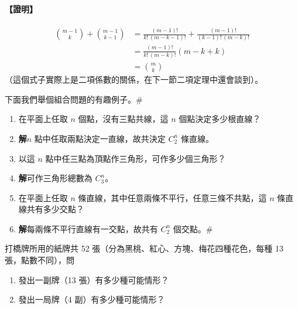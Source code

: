\paragraph{【證明】}
\begin{align*}
\binom{m-1}{k} + \binom{m-1}{k-1} &= \frac{(m-1)!}{k!\, (m-k-1)!} + \frac{(m-1)!}{(k-1)!\, (m-k)!} \\
&= \frac{(m-1)!}{k!\, (m-k)!} (m - k + k) \\
&= \binom{m}{k}
\end{align*}
（這個式子實際上是二項係數的關係，在下一節二項定理中還會談到）。

下面我們舉個組合問題的有趣例子。\hfill $\#$

\medskip
\begin{example}\label{ex:b5-2-14}
\begin{enumerate}[label=(\roman*), topsep=2pt, itemsep=4pt]
  \item 在平面上任取 $n$ 個點，沒有三點共線，這 $n$ 個點決定多少根直線？
  \item[] \textbf{解}\quad $n$ 點中任取兩點決定一直線，故共決定 $C_2^n$ 條直線。
  \item 以這 $n$ 點中任三點為頂點作三角形，可作多少個三角形？
  \item[] \textbf{解}\quad 可作三角形總數為 $C_3^n$。
  \item 在平面上任取 $n$ 條直線，其中任意兩條不平行，任意三條不共點，這 $n$ 條直線共有多少交點？
  \item[] \textbf{解}\quad 每兩條不平行直線有一交點，故共有 $C_2^n$ 個交點。\hfill $\#$
\end{enumerate}
\end{example}

\medskip
\begin{example}\label{ex:b5-2-15}
打橋牌所用的紙牌共 52 張（分為黑桃、紅心、方塊、梅花四種花色，每種 13 張，點數不同），問
\begin{enumerate}[label=(\roman*), topsep=2pt, itemsep=4pt]
  \item 發出一副牌（13 張）有多少種可能情形？
  \item 發出一局牌（4 副）有多少種可能情形？
\end{enumerate}
\end{example}
